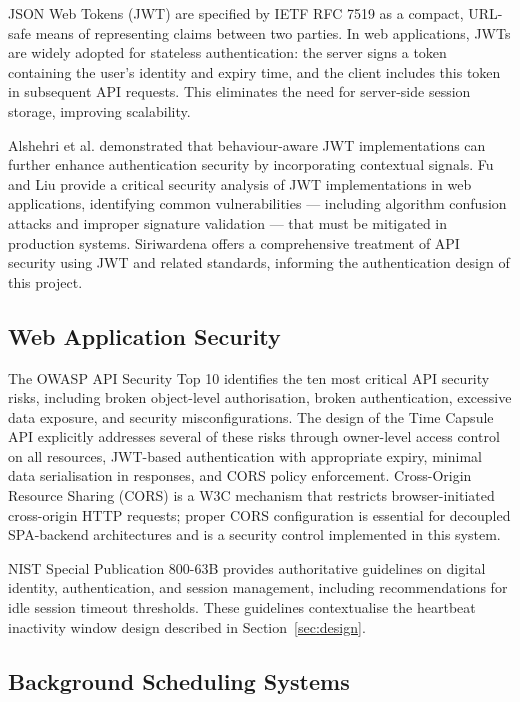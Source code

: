 \documentclass[12pt, a4paper]{article}
\begin{document}
JSON Web Tokens (JWT) are specified by IETF RFC 7519 \cite{rfc7519} as a compact, URL-safe means of representing claims between two parties. In web applications, JWTs are widely adopted for stateless authentication: the server signs a token containing the user's identity and expiry time, and the client includes this token in subsequent API requests. This eliminates the need for server-side session storage, improving scalability.

Alshehri et al. \cite{alshehri2023} demonstrated that behaviour-aware JWT implementations can further enhance authentication security by incorporating contextual signals. Fu and Liu \cite{fu2022} provide a critical security analysis of JWT implementations in web applications, identifying common vulnerabilities — including algorithm confusion attacks and improper signature validation — that must be mitigated in production systems. Siriwardena \cite{siriwardena2014} offers a comprehensive treatment of API security using JWT and related standards, informing the authentication design of this project.

\subsection{Web Application Security}

The OWASP API Security Top 10 \cite{owasp2023} identifies the ten most critical API security risks, including broken object-level authorisation, broken authentication, excessive data exposure, and security misconfigurations. The design of the Time Capsule API explicitly addresses several of these risks through owner-level access control on all resources, JWT-based authentication with appropriate expiry, minimal data serialisation in responses, and CORS policy enforcement. Cross-Origin Resource Sharing (CORS) \cite{cors2024} is a W3C mechanism that restricts browser-initiated cross-origin HTTP requests; proper CORS configuration is essential for decoupled SPA-backend architectures and is a security control implemented in this system.

NIST Special Publication 800-63B \cite{nist800-63b} provides authoritative guidelines on digital identity, authentication, and session management, including recommendations for idle session timeout thresholds. These guidelines contextualise the heartbeat inactivity window design described in Section~\ref{sec:design}.

\subsection{Background Scheduling Systems}
\end{document}
